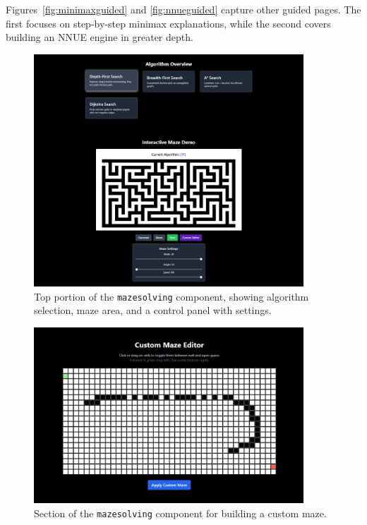 \documentclass[12pt,a4paper]{article}
\begin{document}
\noindent
Figures~\ref{fig:minimaxguided} and \ref{fig:nnueguided} capture other guided 
pages. The first focuses on step-by-step minimax explanations, while the second 
covers building an NNUE engine in greater depth.

\FloatBarrier
\begin{figure}[htbp]
  \centering
  \includegraphics[width=0.9\textwidth]{figures/mazesolvingmain.png}
  \caption{Top portion of the \texttt{mazesolving} component, showing algorithm selection, maze area, and a control panel with settings.}
  \label{fig:mazesolvingmain}
\end{figure}

\begin{figure}[htbp]
  \centering
  \includegraphics[width=0.9\textwidth]{figures/Custommaze.png}
  \caption{Section of the \texttt{mazesolving} component for building a custom maze.}
  \label{fig:custommaze}
\end{figure}
\end{document}
